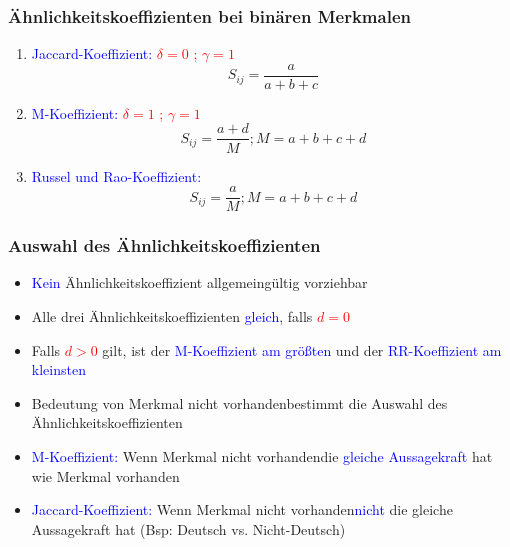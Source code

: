 \documentclass{beamer}
\begin{document}
\begin{frame}
 \frametitle{Ähnlichkeitskoeffizienten bei binären Merkmalen}
 \begin{enumerate}	
	\item \textcolor{blue}{Jaccard-Koeffizient:} \textcolor{red}{$\delta =0$ ; $\gamma =1$}
 				\begin{equation}
  				 \ S_{ij}=\frac{a}{a+b+c}
 				\end{equation}
	\item \textcolor{blue}{M-Koeffizient:} \textcolor{red}{$\delta =1$ ; $\gamma =1$}
 				\begin{equation}
  				 \ S_{ij}=\frac{a+d}{M} ;     M=a+b+c+d
 				\end{equation}
	\item \textcolor{blue}{Russel und Rao-Koeffizient:}
 				\begin{equation}
  				 \ S_{ij}=\frac{a}{M} ;     M=a+b+c+d
 				\end{equation}
 \end{enumerate}

\end{frame}

\begin{frame}
 \frametitle{Auswahl des Ähnlichkeitskoeffizienten}

 \begin{itemize}
  \item \textcolor{blue}{Kein} Ähnlichkeitskoeffizient allgemeingültig vorziehbar
  \item Alle drei Ähnlichkeitskoeffizienten \textcolor{blue}{gleich}, falls \textcolor{red}{$d=0$}
  \item Falls \textcolor{red}{$d>0$} gilt, ist der \textcolor{blue}{M-Koeffizient am größten} und der \textcolor{blue}{RR-Koeffizient am kleinsten}
  \item Bedeutung von \glqq Merkmal nicht vorhanden\grqq bestimmt die Auswahl des Ähnlichkeitskoeffizienten
  \item \textcolor{blue}{M-Koeffizient:} Wenn \glqq Merkmal nicht vorhanden\grqq die \textcolor{blue}{gleiche Aussagekraft} hat wie \glqq Merkmal vorhanden\grqq
  \item \textcolor{blue}{Jaccard-Koeffizient:} Wenn \glqq Merkmal nicht vorhanden\grqq \textcolor{blue}{nicht} die gleiche Aussagekraft hat (Bsp: Deutsch vs. Nicht-Deutsch)

 \end{itemize}

\end{frame}
\end{document}
